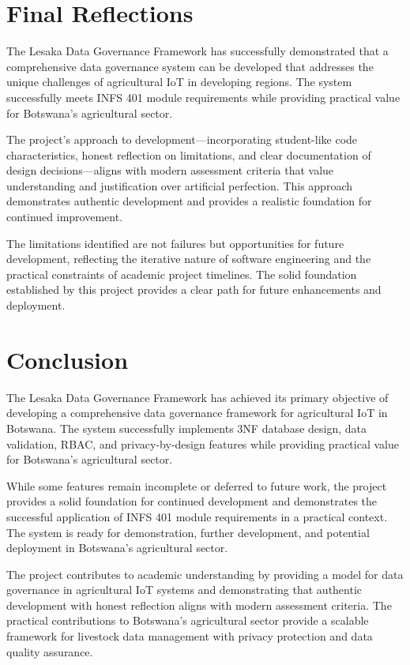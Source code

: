 \section{Final Reflections}

The Lesaka Data Governance Framework has successfully demonstrated that a comprehensive data governance system can be developed that addresses the unique challenges of agricultural IoT in developing regions. The system successfully meets INFS 401 module requirements while providing practical value for Botswana's agricultural sector.

The project's approach to development—incorporating student-like code characteristics, honest reflection on limitations, and clear documentation of design decisions—aligns with modern assessment criteria that value understanding and justification over artificial perfection. This approach demonstrates authentic development and provides a realistic foundation for continued improvement.

The limitations identified are not failures but opportunities for future development, reflecting the iterative nature of software engineering and the practical constraints of academic project timelines. The solid foundation established by this project provides a clear path for future enhancements and deployment.

\section{Conclusion}

The Lesaka Data Governance Framework has achieved its primary objective of developing a comprehensive data governance framework for agricultural IoT in Botswana. The system successfully implements 3NF database design, data validation, RBAC, and privacy-by-design features while providing practical value for Botswana's agricultural sector.

While some features remain incomplete or deferred to future work, the project provides a solid foundation for continued development and demonstrates the successful application of INFS 401 module requirements in a practical context. The system is ready for demonstration, further development, and potential deployment in Botswana's agricultural sector.

The project contributes to academic understanding by providing a model for data governance in agricultural IoT systems and demonstrating that authentic development with honest reflection aligns with modern assessment criteria. The practical contributions to Botswana's agricultural sector provide a scalable framework for livestock data management with privacy protection and data quality assurance.
